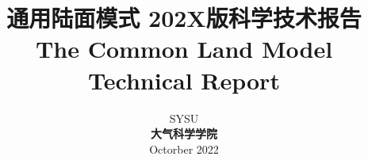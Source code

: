 \documentclass[a4paper,12pt,twoside]{report}
\begin{document}


\title{\huge {\bf 通用陆面模式 202X版科学技术报告}\\[3em]
\fontsize {22}{24}
\bf{ The Common Land Model Technical Report }\\[3in]
\fontsize {20}{23}%
}

\author{
 \large{ SYSU }\\[0.1in]
 {\bf 大气科学学院}\\[1in]
 \upshape
 \large%
 Octorber 2022
}

\normallinespacing
\maketitle

\preface


%
%
%
%

\body


















\appendix
{}


\renewcommand{\bibname}{References}


\end{document}
